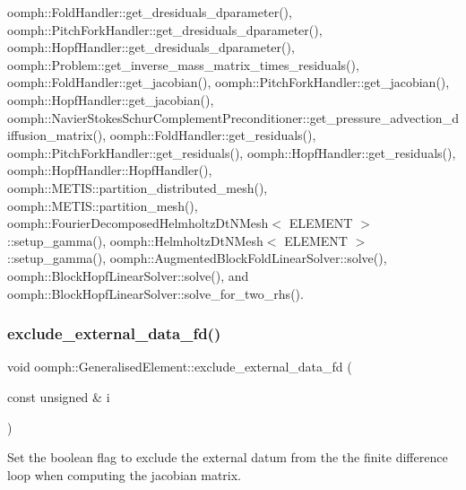 oomph\+::\+Fold\+Handler\+::get\+\_\+dresiduals\+\_\+dparameter(), oomph\+::\+Pitch\+Fork\+Handler\+::get\+\_\+dresiduals\+\_\+dparameter(), oomph\+::\+Hopf\+Handler\+::get\+\_\+dresiduals\+\_\+dparameter(), oomph\+::\+Problem\+::get\+\_\+inverse\+\_\+mass\+\_\+matrix\+\_\+times\+\_\+residuals(), oomph\+::\+Fold\+Handler\+::get\+\_\+jacobian(), oomph\+::\+Pitch\+Fork\+Handler\+::get\+\_\+jacobian(), oomph\+::\+Hopf\+Handler\+::get\+\_\+jacobian(), oomph\+::\+Navier\+Stokes\+Schur\+Complement\+Preconditioner\+::get\+\_\+pressure\+\_\+advection\+\_\+diffusion\+\_\+matrix(), oomph\+::\+Fold\+Handler\+::get\+\_\+residuals(), oomph\+::\+Pitch\+Fork\+Handler\+::get\+\_\+residuals(), oomph\+::\+Hopf\+Handler\+::get\+\_\+residuals(), oomph\+::\+Hopf\+Handler\+::\+Hopf\+Handler(), oomph\+::\+M\+E\+T\+I\+S\+::partition\+\_\+distributed\+\_\+mesh(), oomph\+::\+M\+E\+T\+I\+S\+::partition\+\_\+mesh(), oomph\+::\+Fourier\+Decomposed\+Helmholtz\+Dt\+N\+Mesh$<$ E\+L\+E\+M\+E\+N\+T $>$\+::setup\+\_\+gamma(), oomph\+::\+Helmholtz\+Dt\+N\+Mesh$<$ E\+L\+E\+M\+E\+N\+T $>$\+::setup\+\_\+gamma(), oomph\+::\+Augmented\+Block\+Fold\+Linear\+Solver\+::solve(), oomph\+::\+Block\+Hopf\+Linear\+Solver\+::solve(), and oomph\+::\+Block\+Hopf\+Linear\+Solver\+::solve\+\_\+for\+\_\+two\+\_\+rhs().

\mbox{\label{classoomph_1_1GeneralisedElement_af67b6dd1e2d93449e5a898d9b02df605}} 
\subsubsection{\texorpdfstring{exclude\+\_\+external\+\_\+data\+\_\+fd()}{exclude\_external\_data\_fd()}}
{\footnotesize\ttfamily void oomph\+::\+Generalised\+Element\+::exclude\+\_\+external\+\_\+data\+\_\+fd (\begin{DoxyParamCaption}\item[{const unsigned \&}]{i }\end{DoxyParamCaption})\hspace{0.3cm}{\ttfamily [inline]}}



Set the boolean flag to exclude the external datum from the the finite difference loop when computing the jacobian matrix. 



